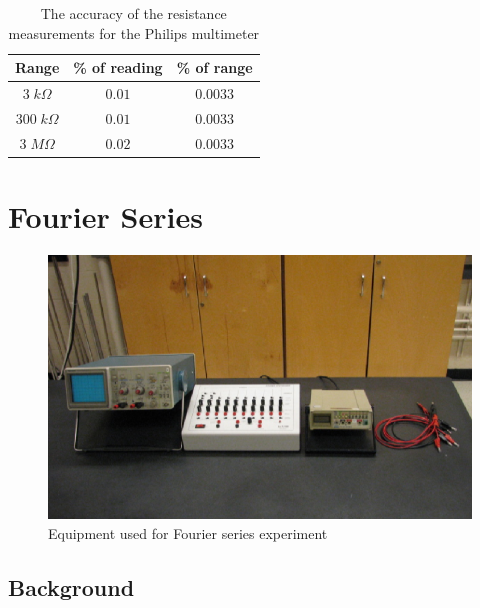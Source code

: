 \documentclass[12pt, a4paper, oneside, openright, titlepage]{book}
\begin{document}
\begin{table}[H]
    \centering
    \caption{The accuracy of the resistance measurements for the Philips multimeter}
    \begin{tabular}{|c|c|c|}
        \hline
        Range & \% of reading & \% of range \\ \hline \hline
        $3\;k\Omega$ & $0.01$ & $0.0033$ \\ 
        $ 300\;k\Omega$ & $0.01$ & $0.0033$ \\
        $ 3\;M\Omega$ & $0.02$ & $0.0033$ \\ \hline
    \end{tabular}
    \label{tab:DC2}
\end{table}




\chapter{Fourier Series}

\begin{figure}[H]
    \centering
    \includegraphics[scale = 0.8]{Images/FS1.PNG}
    \caption{Equipment used for Fourier series experiment}
    \label{fig:FS1}
\end{figure}

\section{Background}
\end{document}
